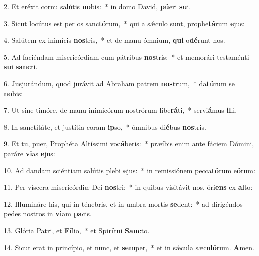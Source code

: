 
2. Et eréxit cornu salútis \textbf{no}bis:~* in domo David, \textbf{pú}eri \textbf{su}i.

3. Sicut locútus est per os sanc\textbf{tó}rum,~* qui a s\'{\ae}culo sunt, prophe\textbf{tá}rum \textbf{e}jus:

4. Salútem ex inimícis \textbf{nos}tris,~* et de manu ómnium, \textbf{qui} o\textbf{dé}runt nos.

5. Ad faciéndam misericórdiam cum pátribus \textbf{nos}tris:~* et memorári testaménti \textbf{su}i \textbf{sanc}ti.

6. Jusjurándum, quod jurávit ad Abraham patrem \textbf{nos}trum,~* da\textbf{tú}rum se \textbf{no}bis:

7. Ut sine timóre, de manu inimicórum nostrórum libe\textbf{rá}ti,~* servi\textbf{á}mus \textbf{il}li.

8. In sanctitáte, et justítia coram \textbf{ip}so,~* ómnibus di\textbf{é}bus \textbf{nos}tris.

9. Et tu, puer, Prophéta Altíssimi vo\textbf{cá}beris:~* præíbis enim ante fáciem Dómini, paráre \textbf{vi}as \textbf{e}jus:

10. Ad dandam sciéntiam salútis plebi \textbf{e}jus:~* in remissiónem pecca\textbf{tó}rum e\textbf{ó}rum:

11. Per víscera misericórdiæ Dei \textbf{nos}tri:~* in quibus visitávit nos, óri\textbf{ens} ex \textbf{al}to:

12. Illumináre his, qui in ténebris, et in umbra mortis \textbf{se}dent:~* ad dirigéndos pedes nostros in \textbf{vi}am \textbf{pa}cis.

13. Glória Patri, et \textbf{Fí}lio,~* et Spi\textbf{rí}tui \textbf{Sanc}to.

14. Sicut erat in princípio, et nunc, et \textbf{sem}per,~* et in s\'{\ae}cula sæcu\textbf{ló}rum. \textbf{A}men.